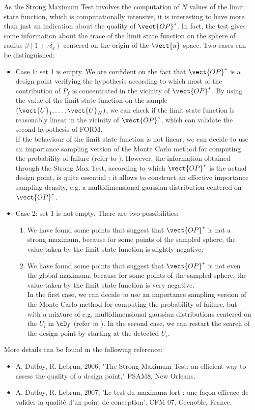 {  As the Strong Maximum Test involves the computation of $N$ values of the limit state function, which is computationally intensive, it is interesting to have more than just an indication about the quality of $\vect{OP}^*$. In fact, the test gives some information about the trace of the limit state function on the sphere of radius $\beta(1+\tau \delta_{\varepsilon})$ centered on the origin of the $\vect{u}$-space. Two cases can be distinguished:
  \begin{itemize}
  \item Case 1: set 1 is empty. We are confident on the fact that $\vect{OP}^*$ is a design point verifying the hypothesis according to which most of the contribution of $P_f$ is concentrated in the vicinity of $\vect{OP}^*$. By using the value of the limit state function on the sample $(\vect{U}_1, \dots, \vect{U}_N)$, we can check if the limit state function is reasonably linear in the vicinity of $\vect{OP}^*$, which can validate the second hypothesis of FORM. \\
    If the behaviour of the limit state function is not linear, we can decide to use an importance sampling version of the Monte Carlo method for computing the probability of failure (refer to ). However, the information obtained through the Strong Max Test, according to which $\vect{OP}^*$ is the actual design point, is quite essential : it allows to construct an effective importance sampling density, e.g. a multidimensional gaussian distribution centered on $\vect{OP}^*$.
  \item Case 2: set 1 is not empty. There are two possibilities:
    \begin{enumerate}
    \item We have found some points that suggest that $\vect{OP}^*$ is not a strong maximum, because for some points of the sampled sphere, the value taken by the limit state function is slightly negative;
    \item We have found some points that suggest that $\vect{OP}^*$ is not even the global maximum, because for some points of the sampled sphere, the value taken by the limit state function is very negative.\\
      In the first case, we can decide to use an importance sampling version of the Monte Carlo method for computing the probability of failure, but with a mixture of e.g. multidimensional gaussian distributions centered on the $U_i$ in $\cD_f$ (refer to ).
      In the second case, we can restart the search of the design point by starting at the detected $U_i$.
    \end{enumerate}
  \end{itemize}
  More details can be found in the following reference:
  \begin{itemize}
  \item A. Dutfoy, R. Lebrun, 2006, "The Strong Maximum Test: an efficient way to assess the quality of a design point," PSAM8, New Orleans.
  \item A. Dutfoy, R. Lebrun, 2007, 'Le test du maximum fort : une façon efficace de valider la qualité d'un point de conception', CFM 07, Grenoble, France.
  \end{itemize}
}
